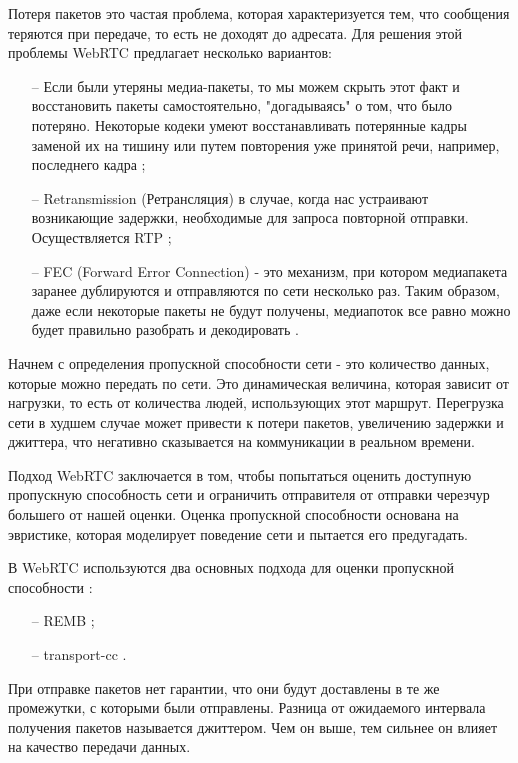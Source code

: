 
Потеря пакетов это частая проблема, которая характеризуется тем, что сообщения теряются при передаче, то есть не доходят до адресата. Для решения этой проблемы WebRTC предлагает несколько вариантов:
\begin{itemize}
	\item[--] Если были утеряны медиа-пакеты, то мы можем скрыть этот факт и восстановить пакеты самостоятельно, "догадываясь" о том, что было потеряно. Некоторые кодеки умеют восстанавливать потерянные кадры заменой их на тишину или путем повторения уже принятой речи, например, последнего кадра \cite{v8};
	\item[--] Retransmission (Ретрансляция) в случае, когда нас устраивают возникающие задержки, необходимые для запроса повторной отправки. Осуществляется RTP \cite{v9};
        \item[--] FEC (Forward Error Connection) - это механизм, при котором медиапакета заранее дублируются и отправляются по сети несколько раз. Таким образом, даже если некоторые пакеты не будут получены, медиапоток все равно можно будет правильно разобрать и декодировать \cite{v10}.
\end{itemize}


Начнем с определения пропускной способности сети - это количество данных, которые можно передать по сети. Это динамическая величина, которая зависит от нагрузки, то есть от количества людей, использующих этот маршрут. Перегрузка сети в худшем случае может привести к потери пакетов, увеличению задержки и джиттера, что негативно сказывается на коммуникации в реальном времени.

Подход WebRTC заключается в том, чтобы попытаться оценить доступную пропускную способность сети и ограничить отправителя от отправки черезчур большего от нашей оценки. Оценка пропускной способности основана на эвристике, которая моделирует поведение сети и пытается его предугадать.

В WebRTC используются два основных подхода для оценки пропускной способности \cite{v5}:
\begin{itemize}
	\item[--] REMB \cite{v6};
	\item[--] transport-cc \cite{v7}.
\end{itemize}


При отправке пакетов нет гарантии, что они будут доставлены в те же промежутки, с которыми были отправлены. Разница от ожидаемого интервала получения пакетов называется джиттером. Чем он выше, тем сильнее он влияет на качество передачи данных.


